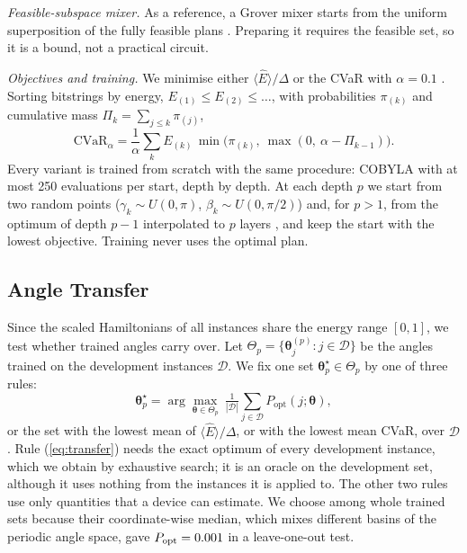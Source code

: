 \documentclass[conference]{IEEEtran}
\begin{document}
\textit{Feasible-subspace mixer.} As a reference, a Grover mixer starts from the uniform superposition of the fully feasible plans \cite{Bartschi2020,Fuchs2024}. Preparing it requires the feasible set, so it is a bound, not a practical circuit.

\textit{Objectives and training.} We minimise either $\langle\hat E\rangle/\Delta$ or the CVaR with $\alpha=0.1$ \cite{Barkoutsos2020}. Sorting bitstrings by energy, $E_{(1)}\le E_{(2)}\le\dots$, with probabilities $\pi_{(k)}$ and cumulative mass $\Pi_k=\sum_{j\le k}\pi_{(j)}$,
\begin{equation}
\mathrm{CVaR}_\alpha=\frac1\alpha\sum_k E_{(k)}\,\min\!\big(\pi_{(k)},\ \max(0,\ \alpha-\Pi_{k-1})\big).
\label{eq:cvar}
\end{equation}
Every variant is trained from scratch with the same procedure: COBYLA \cite{Powell1994} with at most 250 evaluations per start, depth by depth. At each depth $p$ we start from two random points ($\gamma_k\sim U(0,\pi)$, $\beta_k\sim U(0,\pi/2)$) and, for $p>1$, from the optimum of depth $p-1$ interpolated to $p$ layers \cite{Zhou2020}, and keep the start with the lowest objective. Training never uses the optimal plan.

\subsection{Angle Transfer}\label{sec:transfer}
Since the scaled Hamiltonians of all instances share the energy range $[0,1]$, we test whether trained angles carry over. Let $\Theta_p=\{\boldsymbol\theta_j^{(p)}:j\in\mathcal{D}\}$ be the angles trained on the development instances $\mathcal{D}$. We fix one set $\boldsymbol\theta^{\star}_p\in\Theta_p$ by one of three rules:
\begin{equation}
\boldsymbol\theta^{\star}_p=\arg\max_{\boldsymbol\theta\in\Theta_p}\ \tfrac{1}{|\mathcal{D}|}\textstyle\sum_{j\in\mathcal{D}}P_{\mathrm{opt}}(j;\boldsymbol\theta),
\label{eq:transfer}
\end{equation}
or the set with the lowest mean of $\langle\hat E\rangle/\Delta$, or with the lowest mean CVaR, over $\mathcal{D}$. Rule (\ref{eq:transfer}) needs the exact optimum of every development instance, which we obtain by exhaustive search; it is an oracle on the development set, although it uses nothing from the instances it is applied to. The other two rules use only quantities that a device can estimate. We choose among whole trained sets because their coordinate-wise median, which mixes different basins of the periodic angle space, gave $P_{\mathrm{opt}}=0.001$ in a leave-one-out test.
\end{document}

